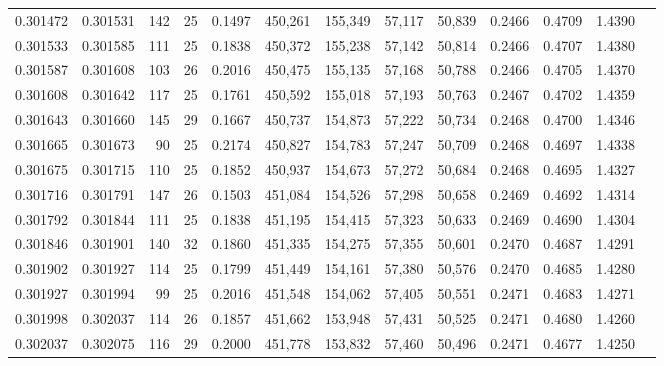 \begin{tabular}{rrrrrrrrrrrrr}
0.301472 & 0.301531 &   142 &  25 &                                     0.1497 & 450,261 & 155,349 &  57,117 &  50,839 & 0.2466 & 0.4709 & 1.4390 \\
0.301533 & 0.301585 &   111 &  25 &                                     0.1838 & 450,372 & 155,238 &  57,142 &  50,814 & 0.2466 & 0.4707 & 1.4380 \\
0.301587 & 0.301608 &   103 &  26 &                                     0.2016 & 450,475 & 155,135 &  57,168 &  50,788 & 0.2466 & 0.4705 & 1.4370 \\
0.301608 & 0.301642 &   117 &  25 &                                     0.1761 & 450,592 & 155,018 &  57,193 &  50,763 & 0.2467 & 0.4702 & 1.4359 \\
0.301643 & 0.301660 &   145 &  29 &                                     0.1667 & 450,737 & 154,873 &  57,222 &  50,734 & 0.2468 & 0.4700 & 1.4346 \\
0.301665 & 0.301673 &    90 &  25 &                                     0.2174 & 450,827 & 154,783 &  57,247 &  50,709 & 0.2468 & 0.4697 & 1.4338 \\
0.301675 & 0.301715 &   110 &  25 &                                     0.1852 & 450,937 & 154,673 &  57,272 &  50,684 & 0.2468 & 0.4695 & 1.4327 \\
0.301716 & 0.301791 &   147 &  26 &                                     0.1503 & 451,084 & 154,526 &  57,298 &  50,658 & 0.2469 & 0.4692 & 1.4314 \\
0.301792 & 0.301844 &   111 &  25 &                                     0.1838 & 451,195 & 154,415 &  57,323 &  50,633 & 0.2469 & 0.4690 & 1.4304 \\
0.301846 & 0.301901 &   140 &  32 &                                     0.1860 & 451,335 & 154,275 &  57,355 &  50,601 & 0.2470 & 0.4687 & 1.4291 \\
0.301902 & 0.301927 &   114 &  25 &                                     0.1799 & 451,449 & 154,161 &  57,380 &  50,576 & 0.2470 & 0.4685 & 1.4280 \\
0.301927 & 0.301994 &    99 &  25 &                                     0.2016 & 451,548 & 154,062 &  57,405 &  50,551 & 0.2471 & 0.4683 & 1.4271 \\
0.301998 & 0.302037 &   114 &  26 &                                     0.1857 & 451,662 & 153,948 &  57,431 &  50,525 & 0.2471 & 0.4680 & 1.4260 \\
0.302037 & 0.302075 &   116 &  29 &                                     0.2000 & 451,778 & 153,832 &  57,460 &  50,496 & 0.2471 & 0.4677 & 1.4250 \\

\end{tabular}
